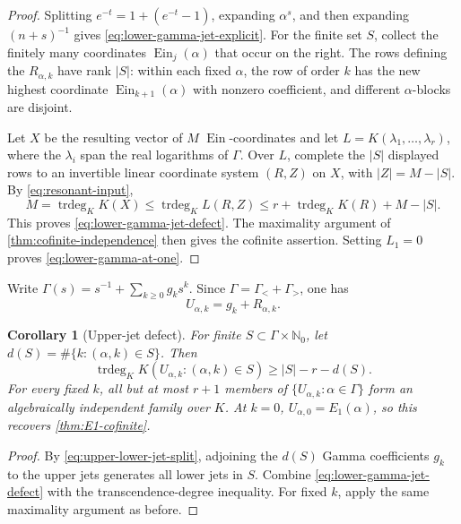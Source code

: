 \documentclass[11pt]{article}
\theoremstyle{keio}
\newtheorem{corollary}[theorem]{Corollary}
\theoremstyle{definition}
\theoremstyle{remark}
\newcommand{\N}{\mathbb N}
\newcommand{\Ein}{\operatorname{Ein}}
\newcommand{\trdeg}{\operatorname{trdeg}}
\begin{document}
\begin{proof}
Splitting \(e^{-t}=1+(e^{-t}-1)\), expanding \(\alpha^s\), and then
expanding \((n+s)^{-1}\) gives \eqref{eq:lower-gamma-jet-explicit}.
For the finite set \(S\), collect the finitely many coordinates
\(\Ein_j(\alpha)\) that occur on the right.  The rows defining the
\(R_{\alpha,k}\) have rank \(|S|\): within each fixed \(\alpha\), the row
of order \(k\) has the new highest coordinate \(\Ein_{k+1}(\alpha)\) with
nonzero coefficient, and different \(\alpha\)-blocks are disjoint.

Let \(X\) be the resulting vector of \(M\) \(\Ein\)-coordinates and let
\(L=K(\lambda_1,\ldots,\lambda_r)\), where the \(\lambda_i\) span the real
logarithms of \(\Gamma\).  Over \(L\), complete the \(|S|\) displayed rows
to an invertible linear coordinate system \((R,Z)\) on \(X\), with
\(|Z|=M-|S|\).  By \eqref{eq:resonant-input},
\[
 M=\trdeg_KK(X)
 \le\trdeg_KL(R,Z)
 \le r+\trdeg_KK(R)+M-|S|.
\]
This proves \eqref{eq:lower-gamma-jet-defect}.  The maximality argument of
\cref{thm:cofinite-independence} then gives the cofinite assertion.
Setting \(L_1=0\) proves \eqref{eq:lower-gamma-at-one}.
\end{proof}

Write \(\Gamma(s)=s^{-1}+\sum_{k\ge0}g_ks^k\).  Since
\(\Gamma=\Gamma_<+\Gamma_>\), one has
\begin{equation}\label{eq:upper-lower-jet-split}
 U_{\alpha,k}=g_k+R_{\alpha,k}.
\end{equation}

\begin{corollary}[Upper-jet defect]
\label{cor:upper-gamma-jets}
For finite \(S\subset\Gamma\times\N_0\), let
\(d(S)=\#\{k:(\alpha,k)\in S\}\).  Then
\begin{equation}\label{eq:upper-gamma-jet-defect}
 \boxed{\displaystyle
 \trdeg_KK(U_{\alpha,k}:(\alpha,k)\in S)
 \ge |S|-r-d(S).}
\end{equation}
For every fixed \(k\), all but at most \(r+1\) members of
\(\{U_{\alpha,k}:\alpha\in\Gamma\}\) form an algebraically independent
family over \(K\).  At \(k=0\), \(U_{\alpha,0}=E_1(\alpha)\), so this
recovers \cref{thm:E1-cofinite}.
\end{corollary}

\begin{proof}
By \eqref{eq:upper-lower-jet-split}, adjoining the \(d(S)\) Gamma
coefficients \(g_k\) to the upper jets generates all lower jets in \(S\).
Combine \eqref{eq:lower-gamma-jet-defect} with the transcendence-degree
inequality.  For fixed \(k\), apply the same maximality argument as before.
\end{proof}
\end{document}
